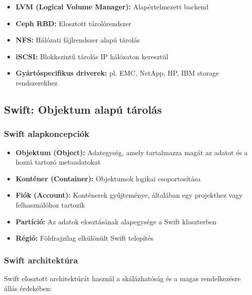 \documentclass[a4paper,12pt]{article}
\begin{document}
    \begin{itemize}
        \item \textbf{LVM (Logical Volume Manager):} Alapértelmezett backend
        \item \textbf{Ceph RBD:} Elosztott tárolórendszer
        \item \textbf{NFS:} Hálózati fájlrendszer alapú tárolás
        \item \textbf{iSCSI:} Blokkszintű tárolás IP hálózaton keresztül
        \item \textbf{Gyártóspecifikus driverek:} pl. EMC, NetApp, HP, IBM storage rendszerekhez
    \end{itemize}

    \subsection{Swift: Objektum alapú tárolás}

    \subsubsection{Swift alapkoncepciók}

    \begin{itemize}
        \item \textbf{Objektum (Object):} Adategység, amely tartalmazza magát az adatot és a hozzá tartozó metaadatokat
        \item \textbf{Konténer (Container):} Objektumok logikai csoportosítása
        \item \textbf{Fiók (Account):} Konténerek gyűjteménye, általában egy projekthez vagy felhasználóhoz tartozik
        \item \textbf{Partíció:} Az adatok elosztásának alapegysége a Swift klaszterben
        \item \textbf{Régió:} Földrajzilag elkülönült Swift telepítés
    \end{itemize}

    \subsubsection{Swift architektúra}

    Swift elosztott architektúrát használ a skálázhatóság és a magas rendelkezésre állás érdekében:
\end{document}
